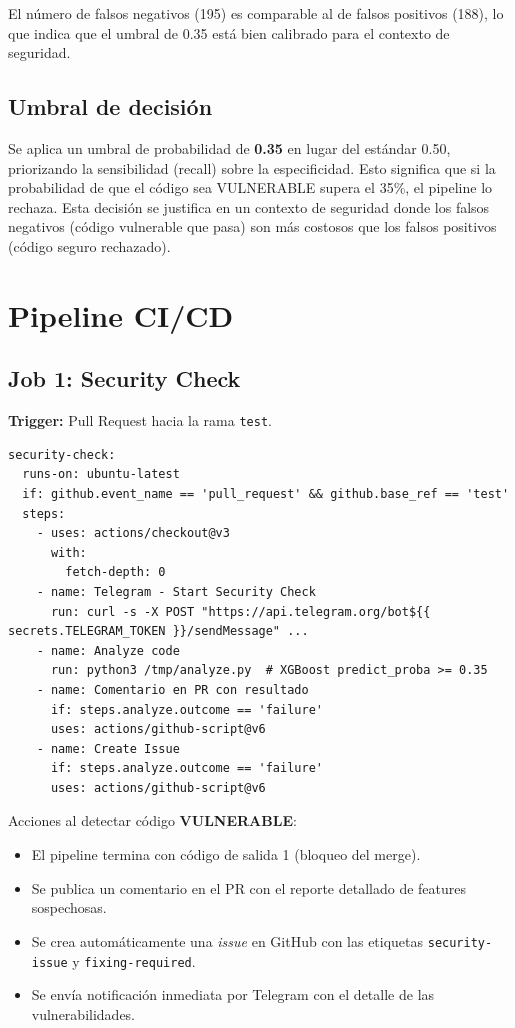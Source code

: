 \documentclass[12pt,a4paper]{article}
\begin{document}
El número de falsos negativos (195) es comparable al de falsos positivos (188), lo que indica que el umbral de 0.35 está bien calibrado para el contexto de seguridad.

\subsection{Umbral de decisión}

Se aplica un umbral de probabilidad de \textbf{0.35} en lugar del estándar 0.50, priorizando la sensibilidad (recall) sobre la especificidad. Esto significa que si la probabilidad de que el código sea VULNERABLE supera el 35\%, el pipeline lo rechaza. Esta decisión se justifica en un contexto de seguridad donde los falsos negativos (código vulnerable que pasa) son más costosos que los falsos positivos (código seguro rechazado).

\section{Pipeline CI/CD}

\subsection{Job 1: Security Check}

\textbf{Trigger:} Pull Request hacia la rama \texttt{test}.

\begin{lstlisting}[style=yaml, caption={Extracto del job de análisis de seguridad}]
security-check:
  runs-on: ubuntu-latest
  if: github.event_name == 'pull_request' && github.base_ref == 'test'
  steps:
    - uses: actions/checkout@v3
      with:
        fetch-depth: 0
    - name: Telegram - Start Security Check
      run: curl -s -X POST "https://api.telegram.org/bot${{ secrets.TELEGRAM_TOKEN }}/sendMessage" ...
    - name: Analyze code
      run: python3 /tmp/analyze.py  # XGBoost predict_proba >= 0.35
    - name: Comentario en PR con resultado
      if: steps.analyze.outcome == 'failure'
      uses: actions/github-script@v6
    - name: Create Issue
      if: steps.analyze.outcome == 'failure'
      uses: actions/github-script@v6
\end{lstlisting}

Acciones al detectar código \textbf{VULNERABLE}:
\begin{itemize}
  \item El pipeline termina con código de salida 1 (bloqueo del merge).
  \item Se publica un comentario en el PR con el reporte detallado de features sospechosas.
  \item Se crea automáticamente una \textit{issue} en GitHub con las etiquetas \texttt{security-issue} y \texttt{fixing-required}.
  \item Se envía notificación inmediata por Telegram con el detalle de las vulnerabilidades.
\end{itemize}
\end{document}
